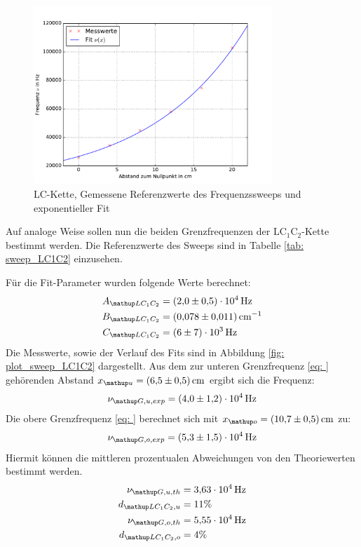 \FloatBarrier
\begin{figure}
  \centering
  \includegraphics[width = 0.8\textwidth]{../Messdaten/plots/frequenzsweep_LC.pdf}
  \caption{LC-Kette, Gemessene Referenzwerte des Frequenzssweeps und exponentieller Fit}
  \label{fig: plot_sweep_LC}
\end{figure}
Auf analoge Weise sollen nun die beiden Grenzfrequenzen der $\mathup{LC_1C_2}$-Kette bestimmt werden. Die Referenzwerte
des Sweeps sind in Tabelle \ref{tab: sweep_LC1C2} einzusehen.
\FloatBarrier

Für die Fit-Parameter wurden folgende Werte berechnet:
\begin{align}
  \begin{aligned}
    A\ua{LC_1C_2} &= \SI{2.0(5)e4}{\hertz}\\
    B\ua{LC_1C_2} &= \SI{0.078(11)}{\cm^{-1}}\\
    C\ua{LC_1C_2} &= \SI{6(7)e3}{\hertz}
  \end{aligned}
  \label{eq: params_LC1C2}
\end{align}
Die Messwerte, sowie der Verlauf des Fits sind in Abbildung \ref{fig: plot_sweep_LC1C2} dargestellt.
Aus dem zur unteren Grenzfrequenz \eqref{eq: } gehörenden Abstand $x\ua{u} = \SI{6.5(5)}{\cm}$ ergibt sich die Frequenz:
\begin{equation}
  \nu\ua{G, u, exp} = \SI{4.0(12)e4}{\hertz}
\end{equation}
Die obere Grenzfrequenz \eqref{eq: } berechnet sich mit $x\ua{o} = \SI{10.7(5)}{\cm}$ zu:
\begin{equation}
    \nu\ua{G, o, exp} = \SI{5.3(15)e4}{\hertz}
\end{equation}
Hiermit können die mittleren prozentualen Abweichungen von den Theoriewerten bestimmt werden.
\begin{align}
  \nu\ua{G,u,th} &= \SI{3.63e4}{\hertz}\\
  d\ua{LC_1C_2,u} &= 11 \%\\
  \nu\ua{G,o,th} &= \SI{5.55e4}{\hertz}\\
  d\ua{LC_1C_2, o} &= 4 \%
\end{align}
